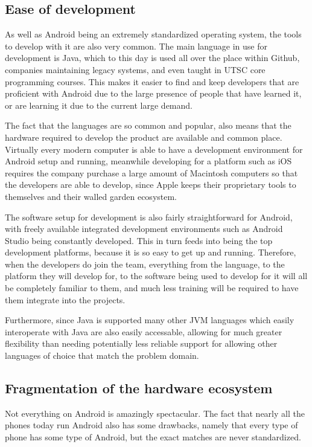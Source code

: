 \documentclass[12pt, letterpaper]{article}
\begin{document}
\subsection{Ease of development}
As well as Android being an extremely standardized operating system, the
tools to develop with it are also very common. The main language in use
for development is Java, which to this day is used all over the place
\cite{java} within Github, companies maintaining legacy systems, and even
taught in UTSC core programming courses. This makes it easier to find and
keep developers that are proficient with Android due to the large presence
of people that have learned it, or are learning it due to the current large
demand.

The fact that the languages are so common and popular, also means that the
hardware required to develop the product are available and common place.
Virtually every modern computer is able to have a development environment
for Android setup and running, meanwhile developing for a platform such as
iOS requires the company purchase a large amount of Macintosh computers
so that the developers are able to develop, since Apple keeps their
proprietary tools to themselves and their walled garden ecosystem.

The software setup for development is also fairly straightforward for
Android, with freely available integrated development environments such
as Android Studio being constantly developed. This in turn feeds into being
the top development platforms, because it is so easy to get up and running.
Therefore, when the developers do join the team, everything from the
language, to the platform they will develop for, to the software being used
to develop for it will all be completely familiar to them, and much less
training will be required to have them integrate into the projects.

Furthermore, since Java is supported many other JVM languages which easily
interoperate with Java are also easily accessable, allowing for much greater
flexibility than needing potentially less reliable support for allowing
other languages of choice that match the problem domain.

\subsection{Fragmentation of the hardware ecosystem}
Not everything on Android is amazingly spectacular. The fact that nearly
all the phones today run Android also has some drawbacks, namely that
every type of phone has some type of Android, but the exact matches are
never standardized.
\end{document}
